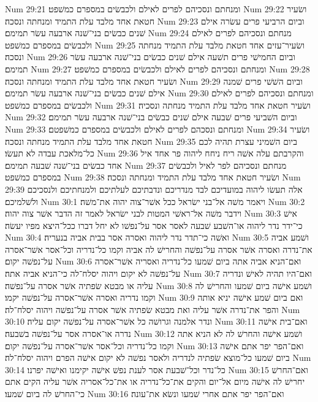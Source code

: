 Num 29:21  ומנחתם ונסכיהם לפרים לאילם ולכבשׂים במספרם כמשׁפט׃
Num 29:22  ושׂעיר חטאת אחד מלבד עלת התמיד ומנחתה ונסכה׃
Num 29:23  וביום הרביעי פרים עשׂרה אילם שׁנים כבשׂים בני־שׁנה ארבעה עשׂר תמימם׃
Num 29:24  מנחתם ונסכיהם לפרים לאילם ולכבשׂים במספרם כמשׁפט׃
Num 29:25  ושׂעיר־עזים אחד חטאת מלבד עלת התמיד מנחתה ונסכה׃
Num 29:26  וביום החמישׁי פרים תשׁעה אילם שׁנים כבשׂים בני־שׁנה ארבעה עשׂר תמימם׃
Num 29:27  ומנחתם ונסכיהם לפרים לאילם ולכבשׂים במספרם כמשׁפט׃
Num 29:28  ושׂעיר חטאת אחד מלבד עלת התמיד ומנחתה ונסכה׃
Num 29:29  וביום השׁשׁי פרים שׁמנה אילם שׁנים כבשׂים בני־שׁנה ארבעה עשׂר תמימם׃
Num 29:30  ומנחתם ונסכיהם לפרים לאילם ולכבשׂים במספרם כמשׁפט׃
Num 29:31  ושׂעיר חטאת אחד מלבד עלת התמיד מנחתה ונסכיה׃
Num 29:32  וביום השׁביעי פרים שׁבעה אילם שׁנים כבשׂים בני־שׁנה ארבעה עשׂר תמימם׃
Num 29:33  ומנחתם ונסכהם לפרים לאילם ולכבשׂים במספרם כמשׁפטם׃
Num 29:34  ושׂעיר חטאת אחד מלבד עלת התמיד מנחתה ונסכה׃
Num 29:35  ביום השׁמיני עצרת תהיה לכם כל־מלאכת עבדה לא תעשׂו׃
Num 29:36  והקרבתם עלה אשׁה ריח ניחח ליהוה פר אחד איל אחד כבשׂים בני־שׁנה שׁבעה תמימם׃
Num 29:37  מנחתם ונסכיהם לפר לאיל ולכבשׂים במספרם כמשׁפט׃
Num 29:38  ושׂעיר חטאת אחד מלבד עלת התמיד ומנחתה ונסכה׃
Num 29:39  אלה תעשׂו ליהוה במועדיכם לבד מנדריכם ונדבתיכם לעלתיכם ולמנחתיכם ולנסכיכם ולשׁלמיכם׃
Num 30:1  ויאמר משׁה אל־בני ישׂראל ככל אשׁר־צוה יהוה את־משׁה׃
Num 30:2  וידבר משׁה אל־ראשׁי המטות לבני ישׂראל לאמר זה הדבר אשׁר צוה יהוה׃
Num 30:3  אישׁ כי־ידר נדר ליהוה או־השׁבע שׁבעה לאסר אסר על־נפשׁו לא יחל דברו ככל־היצא מפיו יעשׂה׃
Num 30:4  ואשׁה כי־תדר נדר ליהוה ואסרה אסר בבית אביה בנעריה׃
Num 30:5  ושׁמע אביה את־נדרה ואסרה אשׁר אסרה על־נפשׁה והחרישׁ לה אביה וקמו כל־נדריה וכל־אסר אשׁר־אסרה על־נפשׁה יקום׃
Num 30:6  ואם־הניא אביה אתה ביום שׁמעו כל־נדריה ואסריה אשׁר־אסרה על־נפשׁה לא יקום ויהוה יסלח־לה כי־הניא אביה אתה׃
Num 30:7  ואם־היו תהיה לאישׁ ונדריה עליה או מבטא שׂפתיה אשׁר אסרה על־נפשׁה׃
Num 30:8  ושׁמע אישׁה ביום שׁמעו והחרישׁ לה וקמו נדריה ואסרה אשׁר־אסרה על־נפשׁה יקמו׃
Num 30:9  ואם ביום שׁמע אישׁה יניא אותה והפר את־נדרה אשׁר עליה ואת מבטא שׂפתיה אשׁר אסרה על־נפשׁה ויהוה יסלח־לה׃
Num 30:10  ונדר אלמנה וגרושׁה כל אשׁר־אסרה על־נפשׁה יקום עליה׃
Num 30:11  ואם־בית אישׁה נדרה או־אסרה אסר על־נפשׁה בשׁבעה׃
Num 30:12  ושׁמע אישׁה והחרשׁ לה לא הניא אתה וקמו כל־נדריה וכל־אסר אשׁר־אסרה על־נפשׁה יקום׃
Num 30:13  ואם־הפר יפר אתם אישׁה ביום שׁמעו כל־מוצא שׂפתיה לנדריה ולאסר נפשׁה לא יקום אישׁה הפרם ויהוה יסלח־לה׃
Num 30:14  כל־נדר וכל־שׁבעת אסר לענת נפשׁ אישׁה יקימנו ואישׁה יפרנו׃
Num 30:15  ואם־החרשׁ יחרישׁ לה אישׁה מיום אל־יום והקים את־כל־נדריה או את־כל־אסריה אשׁר עליה הקים אתם כי־החרשׁ לה ביום שׁמעו׃
Num 30:16  ואם־הפר יפר אתם אחרי שׁמעו ונשׂא את־עונה׃
